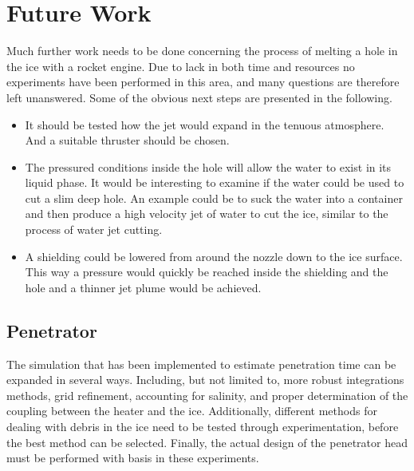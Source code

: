 \chapter{Future Work}


Much further work needs to be done concerning the process of melting a hole in the ice with a rocket engine. Due to lack in both time and resources no experiments have been performed in this area, and many questions are therefore left unanswered. Some of the obvious next steps are presented in the following.
\begin{itemize}
\item It should be tested how the jet would expand in the tenuous atmosphere. And a suitable thruster should be chosen.

\item The pressured conditions inside the hole will allow the water to exist in its liquid phase. It would be interesting to examine if the water could be used to cut a slim deep hole. An example could be to suck the water into a container and then produce a high velocity jet of water to cut the ice, similar to the process of water jet cutting.

\item A shielding could be lowered from around the nozzle down to the ice surface. This way a pressure would quickly be reached inside the shielding and the hole and a thinner jet plume would be achieved.
\end{itemize}

%


\section{Penetrator}
The simulation that has been implemented to estimate penetration time can be expanded in several ways. Including, but not limited to, more robust integrations methods, grid refinement, accounting for salinity, and proper determination of the coupling between the heater and the ice. Additionally, different methods for dealing with debris in the ice need to be tested through experimentation, before the best method can be selected. Finally, the actual design of the penetrator head must be performed with basis in these experiments.


